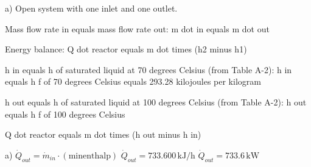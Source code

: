 a) Open system with one inlet and one outlet.  

Mass flow rate in equals mass flow rate out:  
m dot in equals m dot out  

Energy balance:  
Q dot reactor equals m dot times (h2 minus h1)  

h in equals h of saturated liquid at 70 degrees Celsius (from Table A-2):  
h in equals h f of 70 degrees Celsius equals 293.28 kilojoules per kilogram  

h out equals h of saturated liquid at 100 degrees Celsius (from Table A-2):  
h out equals h f of 100 degrees Celsius  

Q dot reactor equals m dot times (h out minus h in)

a) \( \dot{Q}_{out} = \dot{m}_{in} \cdot (\text{minenthalp}) \)  
\( \dot{Q}_{out} = 733.600 \, \text{kJ/h} \)  
\( \dot{Q}_{out} = 733.6 \, \text{kW} \)